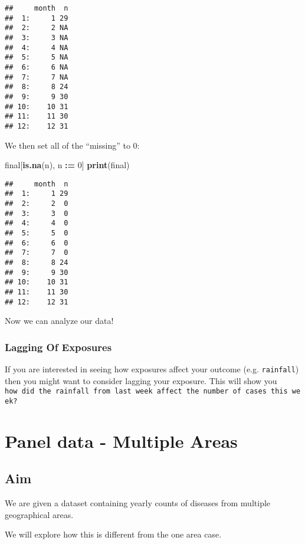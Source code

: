 \documentclass[]{book}
\newenvironment{Shaded}{\begin{snugshade}}{\end{snugshade}}
\newcommand{\KeywordTok}[1]{\textcolor[rgb]{0.13,0.29,0.53}{\textbf{#1}}}
\newcommand{\DecValTok}[1]{\textcolor[rgb]{0.00,0.00,0.81}{#1}}
\newcommand{\StringTok}[1]{\textcolor[rgb]{0.31,0.60,0.02}{#1}}
\newcommand{\OperatorTok}[1]{\textcolor[rgb]{0.81,0.36,0.00}{\textbf{#1}}}
\newcommand{\ErrorTok}[1]{\textcolor[rgb]{0.64,0.00,0.00}{\textbf{#1}}}
\newcommand{\NormalTok}[1]{#1}
\begin{document}
\begin{verbatim}
##     month  n
##  1:     1 29
##  2:     2 NA
##  3:     3 NA
##  4:     4 NA
##  5:     5 NA
##  6:     6 NA
##  7:     7 NA
##  8:     8 24
##  9:     9 30
## 10:    10 31
## 11:    11 30
## 12:    12 31
\end{verbatim}

We then set all of the ``missing'' to 0:

\begin{Shaded}
\begin{Highlighting}[]
\NormalTok{final[}\KeywordTok{is.na}\NormalTok{(n), n }\OperatorTok{:}\ErrorTok{=}\StringTok{ }\DecValTok{0}\NormalTok{]}
\KeywordTok{print}\NormalTok{(final)}
\end{Highlighting}
\end{Shaded}

\begin{verbatim}
##     month  n
##  1:     1 29
##  2:     2  0
##  3:     3  0
##  4:     4  0
##  5:     5  0
##  6:     6  0
##  7:     7  0
##  8:     8 24
##  9:     9 30
## 10:    10 31
## 11:    11 30
## 12:    12 31
\end{verbatim}

Now we can analyze our data!

\subsection{Lagging Of Exposures}\label{lagging-of-exposures}

If you are interested in seeing how exposures affect your outcome (e.g.
\texttt{rainfall}) then you might want to consider lagging your
exposure. This will show you
\texttt{how\ did\ the\ rainfall\ from\ last\ week\ affect\ the\ number\ of\ cases\ this\ week?}

\chapter{Panel data - Multiple Areas}\label{panel-data---multiple-areas}

\section{Aim}\label{aim-1}

We are given a dataset containing yearly counts of diseases from
multiple geographical areas.

We will explore how this is different from the one area case.
\end{document}
